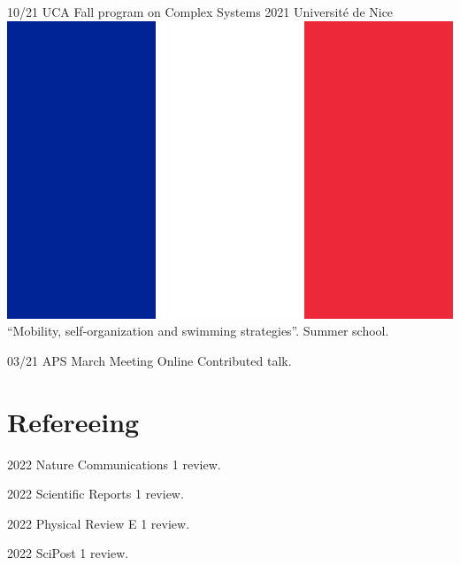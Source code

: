 \documentclass[letterpaper]{cvtemplate_en} %
\begin{document}
\begin{cvbody}
\cvitem
	{10/21}
	{}
	{UCA Fall program on Complex Systems 2021}
	{Universit\'e de Nice \includegraphics[height=0.8\myheight]{fr}}
	{}{}{}
	{}
	{``Mobility, self-organization and swimming strategies''. Summer school.\\}

\cvitem
	{03/21}
	{}
	{APS March Meeting}
	{Online \faGlobe}
	{}{}{}
	{}
	{Contributed talk.\\}

\end{cvbody}


\section{Refereeing}

\begin{cvbody}

\cvitem
	{2022}
	{}
	{Nature Communications}
	{1 review.\vspace{-5pt}}
	{}{}{}
	{}
	{}

\cvitem
	{2022}
	{}
	{Scientific Reports}
	{1 review.}
	{}{}{}
	{}
	{}

\cvitem
	{2022}
	{}
	{Physical Review E}
	{1 review.}
	{}{}{}
	{}
	{}

\cvitem
	{2022}
	{}
	{SciPost}
	{1 review.}
	{}{}{}
	{}
	{}

\end{cvbody}
\end{document}
